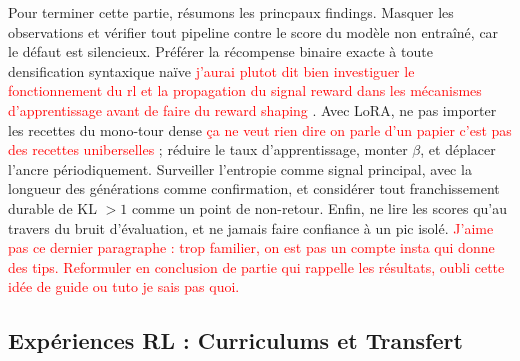 \documentclass[11pt,a4paper]{article}
\begin{document}
Pour terminer cette partie, résumons les princpaux findings. Masquer les observations et vérifier tout pipeline contre le score du modèle non entraîné, car le défaut est silencieux. Préférer la récompense binaire exacte à toute densification syntaxique naïve \textcolor{red}{j'aurai plutot dit bien investiguer le fonctionnement du rl et la propagation du signal reward dans les mécanismes d'apprentissage avant de faire du reward shaping} . Avec LoRA, ne pas importer les recettes du mono-tour dense \textcolor{red}{ça ne veut rien dire on parle d'un papier c'est pas des recettes uniberselles} ; réduire le taux d'apprentissage, monter $\beta$, et déplacer l'ancre périodiquement. Surveiller l'entropie comme signal principal, avec la longueur des générations comme confirmation, et considérer tout franchissement durable de KL $> 1$ comme un point de non-retour. Enfin, ne lire les scores qu'au travers du bruit d'évaluation, et ne jamais faire confiance à un pic isolé. 
\textcolor{red}{J'aime pas ce dernier paragraphe : trop familier, on est pas un compte insta qui donne des tips. Reformuler en conclusion de partie qui rappelle les résultats, oubli cette idée de guide ou tuto je sais pas quoi.} 






\subsection{Expériences RL : Curriculums et Transfert}
\label{sec:curriculums}
\end{document}
